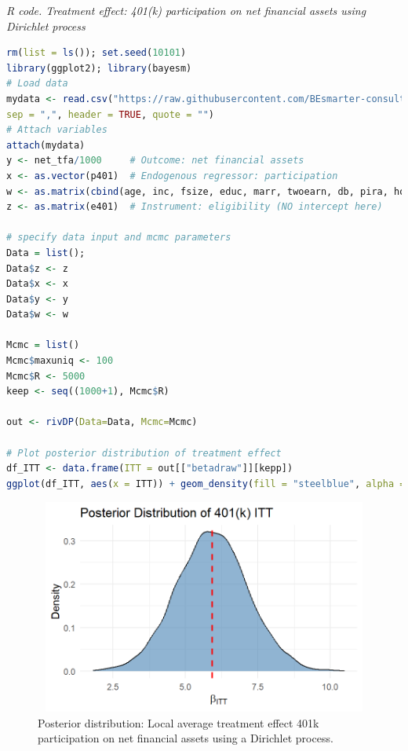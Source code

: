 \begin{enumerate}[leftmargin=*]
\begin{tcolorbox}[enhanced,width=4.67in,center upper,
	fontupper=\large\bfseries,drop shadow southwest,sharp corners]
	\textit{R code. Treatment effect: 401(k) participation on net financial assets using Dirichlet process}
	\begin{VF}
		\begin{lstlisting}[language=R]		
rm(list = ls()); set.seed(10101)
library(ggplot2); library(bayesm)
# Load data
mydata <- read.csv("https://raw.githubusercontent.com/BEsmarter-consultancy/BSTApp/refs/heads/master/DataApp/401k.csv",
sep = ",", header = TRUE, quote = "")
# Attach variables
attach(mydata)
y <- net_tfa/1000     # Outcome: net financial assets
x <- as.vector(p401)  # Endogenous regressor: participation
w <- as.matrix(cbind(age, inc, fsize, educ, marr, twoearn, db, pira, hown))  # Exogenous regressors with intercept
z <- as.matrix(e401)  # Instrument: eligibility (NO intercept here)

# specify data input and mcmc parameters
Data = list(); 
Data$z <- z
Data$x <- x
Data$y <- y
Data$w <- w

Mcmc = list()
Mcmc$maxuniq <- 100
Mcmc$R <- 5000
keep <- seq((1000+1), Mcmc$R)

out <- rivDP(Data=Data, Mcmc=Mcmc)

# Plot posterior distribution of treatment effect
df_ITT <- data.frame(ITT = out[["betadraw"]][kepp])
ggplot(df_ITT, aes(x = ITT)) + geom_density(fill = "steelblue", alpha = 0.6) + geom_vline(xintercept = mean(ITT), color = "red", linetype = "dashed", linewidth = 1) + labs(title = "Posterior Distribution of 401(k) ITT: Dirichlet process", x = expression(beta["ITT"]), y = "Density") + theme_minimal(base_size = 14)
\end{lstlisting}
	\end{VF}
\end{tcolorbox} 

\begin{figure}[h!]
	\includegraphics[width=340pt, height=200pt]{Chapters/chapter12/figures/FigP401k.png}
	\caption[List of figure caption goes here]{Posterior distribution: Local average treatment effect 401k participation on net financial assets using a Dirichlet process.}\label{fig12_2}
\end{figure}


\end{enumerate}
